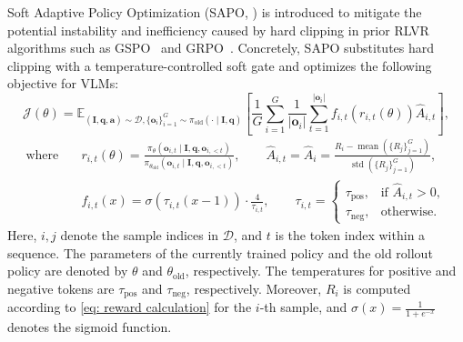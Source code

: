 Soft Adaptive Policy Optimization (SAPO, ) is introduced to mitigate the potential instability and inefficiency caused by hard clipping in prior RLVR algorithms such as GSPO~ and GRPO~.
Concretely, SAPO substitutes hard clipping with a temperature-controlled soft gate and optimizes the following objective for VLMs:
\begin{equation}
\mathcal{J}(\theta)
=
\mathbb{E}_{(\boldsymbol{I}, \boldsymbol{q}, \boldsymbol{a}) \sim \mathcal{D}, \{\boldsymbol{o}_i\}_{i=1}^G \sim \pi_{\text{old}}(\cdot \mid \boldsymbol{I}, \boldsymbol{q})}
\left[
\frac{1}{G}
\sum_{i=1}^{G}
\frac{1}{|\boldsymbol{o}_i|}
\sum_{t=1}^{|\boldsymbol{o}_i|}
f_{i,t}\!\left(r_{i,t}(\theta)\right)
\hat{A}_{i,t}
\right],
\end{equation}
\begin{align}
\text{where} \quad &r_{i,t}(\theta)
=
\frac{
\pi_{\theta}\!\left(\boldsymbol{o}_{i,t} \mid \boldsymbol{I}, \boldsymbol{q}, \boldsymbol{o}_{i,<t}\right)
}{
\pi_{\theta_{\text{old}}}\!\left(\boldsymbol{o}_{i,t} \mid \boldsymbol{I}, \boldsymbol{q}, \boldsymbol{o}_{i,<t}\right)
},
\qquad
\hat{A}_{i,t}
=
\hat{A}_i
=
\frac{
R_i - \operatorname{mean}\!\left(\{R_j\}_{j=1}^{G}\right)
}{
\operatorname{std}\!\left(\{R_j\}_{j=1}^{G}\right)
},
\\
&f_{i,t}(x)
=
\sigma\!\left(\tau_{i,t}(x - 1)\right)
\cdot
\frac{4}{\tau_{i,t}},
\qquad
\tau_{i,t}
=
\begin{cases}
\tau_{\text{pos}}, & \text{if } \hat{A}_{i,t} > 0, \\
\tau_{\text{neg}}, & \text{otherwise}.
\end{cases}
\end{align}
Here, $i, j$ denote the sample indices in $\mathcal{D}$, and $t$ is the token index within a sequence. 
The parameters of the currently trained policy and the old rollout policy are denoted by $\theta$ and $\theta_{\text{old}}$, respectively. 
The temperatures for positive and negative tokens are $\tau_{\text{pos}}$ and $\tau_{\text{neg}}$, respectively. 
Moreover, $R_i$ is computed according to \cref{eq: reward calculation} for the $i$-th sample, and $\sigma(x) = \frac{1}{1 + e^{-x}}$ denotes the sigmoid function.
